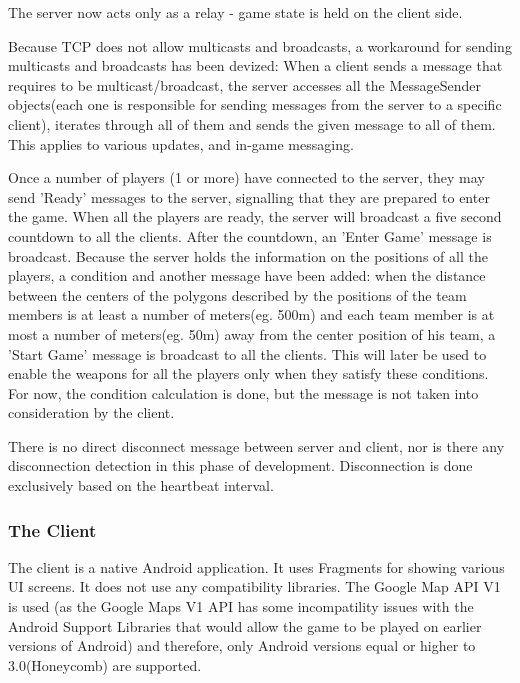The server now acts only as a relay - game state is held on the client
side.\newline

Because TCP does not allow multicasts and broadcasts, a workaround for sending
multicasts and broadcasts has been devized: When a client sends a message that
requires to be multicast/broadcast, the server accesses all the MessageSender
objects(each one is responsible for sending messages from the server to a
specific client), iterates through all of them and sends the given message to
all of them. This applies to various updates, and in-game messaging.\newline

Once a number of players (1 or more) have connected to the server, they may send
'Ready' messages to the server, signalling that they are prepared to enter the
game. When all the players are ready, the server will broadcast a five second
countdown to all the clients. After the countdown, an 'Enter Game' message is
broadcast. Because the server holds the information on the positions of all the
players, a condition and another message have been added: when the distance
between the centers of the polygons described by the positions of the
team members is at least a number of meters(eg. 500m) and each team member is at
most a number of meters(eg. 50m) away from the center position of his team, a
'Start Game' message is broadcast to all the clients. This will later be used to
enable the weapons for all the players only when they satisfy these
conditions. For now, the condition calculation is done, but the message
is not taken into consideration by the client.\newline

There is no direct disconnect message between server and client, nor is there
any disconnection detection in this phase of development. Disconnection is done
exclusively based on the heartbeat interval.\newline

\subsubsection{The Client}

The client is a native Android application. It uses Fragments for showing
various UI screens. It does not use any compatibility libraries. The Google Map
API V1 is used (as the Google Maps V1 API has some incompatility issues with the
Android Support Libraries that would allow the game to be played on earlier
versions of Android) and therefore, only Android versions equal or higher to
3.0(Honeycomb) are supported.

